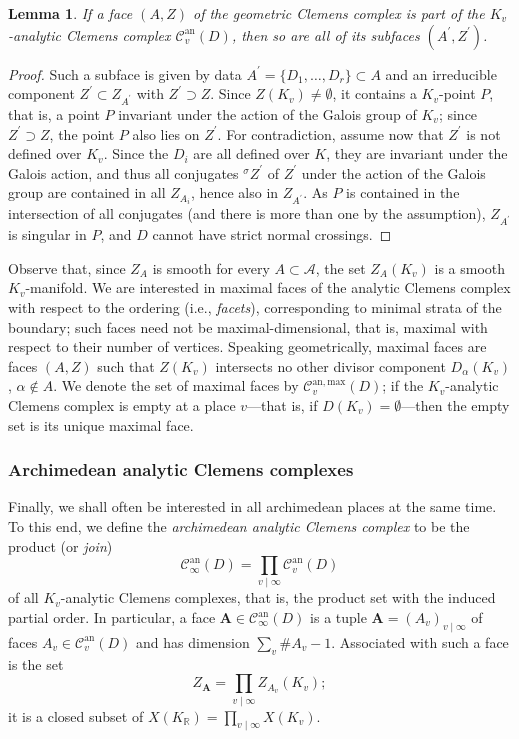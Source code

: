 \documentclass[a4paper, twoside, 10pt]{amsart}
\newcommand{\uA}{{\boldsymbol{A}}}
\newcommand{\cA}{\mathcal{A}}
\newcommand{\cC}{\mathcal{C}}
\newcommand{\RR}{\mathbb{R}}
\newcommand{\Can}{\cC^{\mathrm{an}}}
\newcommand{\Canmax}{\cC^{\mathrm{an,max}}}
\newtheorem{lemma}[theorem]{Lemma}
\theoremstyle{definition}
\begin{document}
\begin{lemma}
  If a face $(A,Z)$ of the geometric Clemens complex is part of the $K_v$-analytic Clemens complex $\Can_{v}(D)$, then so are all of its subfaces $(A^\prime,Z^\prime)$.
\end{lemma}
\begin{proof}
  Such a subface is given by data $A^\prime=\{D_1,\dots,D_r\}\subset A$ and  an irreducible component $Z^\prime \subset Z_{A^\prime}$ with $Z^\prime\supset Z$.
  Since $Z(K_v)\ne\emptyset$, it contains a $K_v$-point $P$, that is, a point $P$ invariant under the action of the Galois group of $K_v$; since $Z^\prime\supset Z$, the point $P$ also lies on $Z^\prime$.
  For contradiction, assume now that $Z^\prime$ is not defined over $K_v$. 
  Since the $D_i$ are all defined over $K$, they are invariant under the Galois action, and thus all conjugates $^\sigma\!Z^\prime$ of $Z^\prime$ under the action of the Galois group are contained in all $Z_{A_i}$, hence also in $Z_{A^\prime}$. As $P$ is contained in the intersection of all conjugates (and there is more than one by the assumption), $Z_{A^\prime}$ is singular in $P$, and $D$ cannot have strict normal crossings.
\end{proof}

Observe that, since $Z_A$ is smooth for every $A\subset \cA$, the set $Z_A(K_v)$ is a smooth $K_v$-manifold.
We are interested in maximal faces of the analytic Clemens complex with respect to the ordering (i.e., \emph{facets}), corresponding to minimal strata of the boundary; such faces need not be maximal-dimensional, that is, maximal with respect to their number of vertices. Speaking geometrically, maximal faces are faces $(A,Z)$ such that $Z(K_v)$ intersects no other divisor component $D_\alpha(K_v)$, $\alpha\not\in A$.  We denote the set of maximal faces by $\Canmax_v(D)$; if the $K_v$-analytic Clemens complex is empty at a place $v$---that is, if $D(K_v)=\emptyset$---then the empty set is its unique maximal face.


\subsubsection{Archimedean analytic Clemens complexes}

Finally, we shall often be interested in all archi\-medean places at the same time. To this end, we define the \emph{archimedean analytic Clemens complex} 
to be the product (or \emph{join})
\[
  \Can_\infty(D) = \prod_{v\mid\infty} \Can_v(D)
\]
of all $K_v$-analytic Clemens complexes, that is, the product set with the induced partial order. In particular, a face $\uA\in\Can_\infty(D)$ is a tuple $\uA=(A_v)_{v\mid\infty}$ of faces $A_v\in\Can_v(D)$ and has dimension $\sum_v \#A_v -1$. 
Associated with such a face is the set
\begin{equation}\label{eq:Z_uA}
  Z_\uA = \prod_{v\mid\infty} Z_{A_v}(K_v);
\end{equation}
it is a closed subset of $X(K_\RR) = \prod_{v\mid\infty} X(K_v)$.
\end{document}
